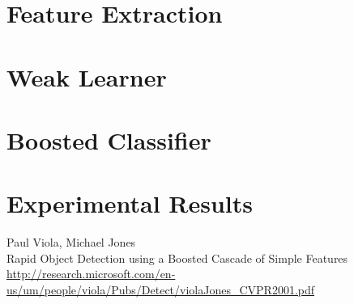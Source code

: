 \documentclass{article}
\begin{document}
\section{Feature Extraction}

\section{Weak Learner}
\label{sec:weaklearner}

\section{Boosted Classifier}
\label{sec:boosting}

\section{Experimental Results}

\begin{thebibliography}{9}

  Paul Viola, Michael Jones\\
  Rapid Object Detection using a Boosted Cascade of Simple Features\\
  \url{http://research.microsoft.com/en-us/um/people/viola/Pubs/Detect/violaJones_CVPR2001.pdf}

\end{thebibliography}
\end{document}
